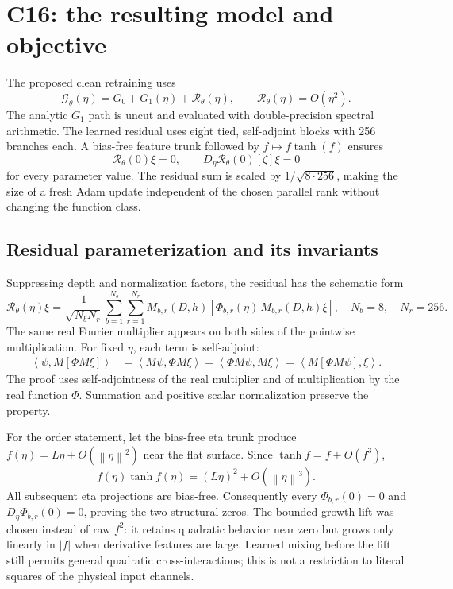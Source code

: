 \documentclass[11pt]{article}
\newcommand{\Gt}{\mathcal{G}_{\theta}}
\newcommand{\R}{\mathcal{R}_{\theta}}
\newcommand{\norm}[1]{\left\lVert #1\right\rVert}
\newcommand{\inner}[2]{\left\langle #1,#2\right\rangle}
\begin{document}
\section{C16: the resulting model and objective}

The proposed clean retraining uses
\begin{equation}
 \Gt(\eta)=G_0+G_1(\eta)+\R(\eta),
 \qquad \R(\eta)=O(\eta^2).
 \label{eq:c16}
\end{equation}
The analytic \(G_1\) path is uncut and evaluated with double-precision spectral
arithmetic.  The learned residual uses eight tied, self-adjoint blocks with 256
branches each.  A bias-free feature trunk followed by
\(f\mapsto f\tanh(f)\) ensures
\begin{equation}
 \R(0)\xi=0,
 \qquad D_\eta\R(0)[\zeta]\xi=0
\end{equation}
for every parameter value.  The residual sum is scaled by
\(1/\sqrt{8\cdot256}\), making the size of a fresh Adam update independent of
the chosen parallel rank without changing the function class.

\subsection{Residual parameterization and its invariants}

Suppressing depth and normalization factors, the residual has the schematic
form
\begin{equation}
 \R(\eta)\xi
 =\frac{1}{\sqrt{N_bN_r}}
  \sum_{b=1}^{N_b}\sum_{r=1}^{N_r}
  M_{b,r}(D,h)
  \left[\Phi_{b,r}(\eta)\,
        M_{b,r}(D,h)\xi\right],
 \quad N_b=8,\quad N_r=256.
 \label{eq:residual-block}
\end{equation}
The same real Fourier multiplier appears on both sides of the pointwise
multiplication.  For fixed \(\eta\), each term is self-adjoint:
\begin{align}
 \inner{\psi}{M[\Phi M\xi]}
 &=\inner{M\psi}{\Phi M\xi}
  =\inner{\Phi M\psi}{M\xi}
  =\inner{M[\Phi M\psi]}{\xi}.
\end{align}
The proof uses self-adjointness of the real multiplier and of multiplication by
the real function \(\Phi\).  Summation and positive scalar normalization
preserve the property.

For the order statement, let the bias-free eta trunk produce
\(f(\eta)=L\eta+O(\norm{\eta}^2)\) near the flat surface.  Since
\(\tanh f=f+O(f^3)\),
\begin{equation}
 f(\eta)\tanh f(\eta)
 =(L\eta)^2+O(\norm{\eta}^3).
\end{equation}
All subsequent eta projections are bias-free.  Consequently every
\(\Phi_{b,r}(0)=0\) and \(D_\eta\Phi_{b,r}(0)=0\), proving the two structural
zeros.  The bounded-growth lift was chosen instead of raw \(f^2\): it retains
quadratic behavior near zero but grows only linearly in \(|f|\) when derivative
features are large.  Learned mixing before the lift still permits general
quadratic cross-interactions; this is not a restriction to literal squares of
the physical input channels.
\end{document}
